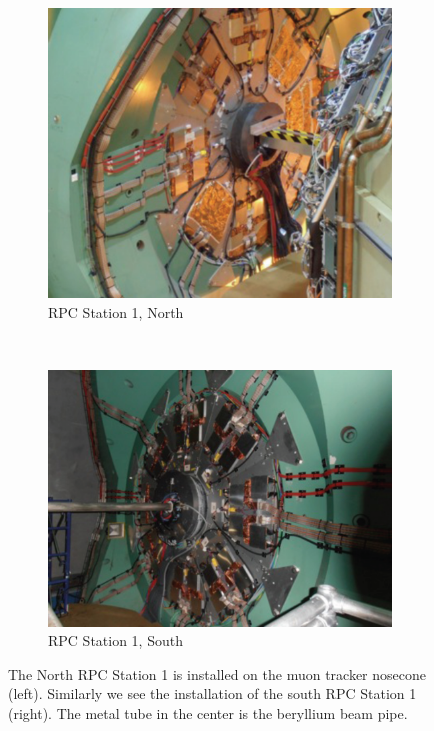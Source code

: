 \begin{figure}
  \centering
  \begin{subfigure}[b]{0.5\textwidth}
    \centering
    \includegraphics[width=\linewidth]{./figures/rpc1_north_installed}
    \caption{RPC Station 1, North}
    \label{fig:rpc1n}
  \end{subfigure}%
  ~
  \begin{subfigure}[b]{0.5\textwidth}
    \centering
    \includegraphics[width=\linewidth]{./figures/rpc1_south_installed}
    \caption{RPC Station 1, South}
    \label{fig:rpc1s}
  \end{subfigure}
  \caption{
    The North RPC Station 1 is installed on the muon tracker nosecone (left).
    Similarly we see the installation of the south RPC Station 1 (right). The
    metal tube in the center is the beryllium beam pipe.
  }
  \label{fig:rpc1_installed}
\end{figure}

